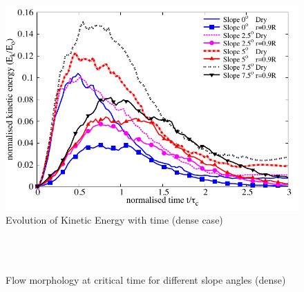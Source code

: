 \documentclass[12pt,a4paper,twocolumn,fleqn]{NARMS}
\begin{document}
\begin{figure}
\centering
\includegraphics[width=0.97\columnwidth]{figs/KE_dense.pdf}
\caption{Evolution of Kinetic Energy with time (dense case)}
\label{fig:KE_dense}
\end{figure}


\begin{figure}
 \\
 \\
\caption{Flow morphology at critical time for different slope angles (dense)}
\label{fig:slope_dense}
\end{figure}
\end{document}
